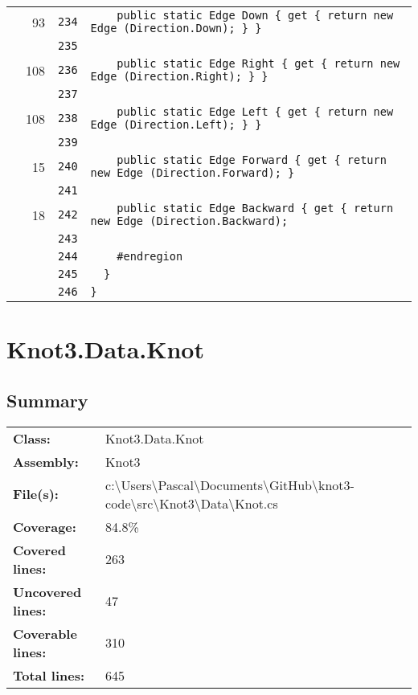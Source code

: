 \documentclass[a4paper,10pt]{article}
\begin{document}
\begin{longtable}[l]{lrrl}
\cellcolor{green} & 93 & \verb~234~ & \verb~    public static Edge Down { get { return new Edge (Direction.Down); } }~\\
\cellcolor{gray} &  & \verb~235~ & \verb~~\\
\cellcolor{green} & 108 & \verb~236~ & \verb~    public static Edge Right { get { return new Edge (Direction.Right); } }~\\
\cellcolor{gray} &  & \verb~237~ & \verb~~\\
\cellcolor{green} & 108 & \verb~238~ & \verb~    public static Edge Left { get { return new Edge (Direction.Left); } }~\\
\cellcolor{gray} &  & \verb~239~ & \verb~~\\
\cellcolor{green} & 15 & \verb~240~ & \verb~    public static Edge Forward { get { return new Edge (Direction.Forward); } ~\\
\cellcolor{gray} &  & \verb~241~ & \verb~~\\
\cellcolor{green} & 18 & \verb~242~ & \verb~    public static Edge Backward { get { return new Edge (Direction.Backward); ~\\
\cellcolor{gray} &  & \verb~243~ & \verb~~\\
\cellcolor{gray} &  & \verb~244~ & \verb~    #endregion~\\
\cellcolor{gray} &  & \verb~245~ & \verb~  }~\\
\cellcolor{gray} &  & \verb~246~ & \verb~}~\\
\end{longtable}
\newpage
\section{Knot3.Data.Knot}
\subsection{Summary}
\begin{longtable}[l]{ll}
\textbf{Class:} & Knot3.Data.Knot\\
\textbf{Assembly:} & Knot3\\
\textbf{File(s):} & \begin{minipage}[t]{12cm}{c:\textbackslash Users\textbackslash Pascal\textbackslash Documents\textbackslash GitHub\textbackslash knot3-code\textbackslash src\textbackslash Knot3\textbackslash Data\textbackslash Knot.cs}\end{minipage} \\
\textbf{Coverage:} & 84.8\%\\
\textbf{Covered lines:} & 263\\
\textbf{Uncovered lines:} & 47\\
\textbf{Coverable lines:} & 310\\
\textbf{Total lines:} & 645\\
\end{longtable}
\end{document}
